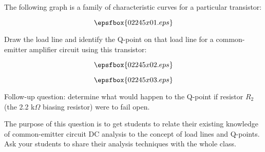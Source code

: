 

The following graph is a family of characteristic curves for a particular transistor:

$$\epsfbox{02245x01.eps}$$

Draw the load line and identify the Q-point on that load line for a common-emitter amplifier circuit using this transistor:

$$\epsfbox{02245x02.eps}$$







$$\epsfbox{02245x03.eps}$$

\vskip 10pt

Follow-up question: determine what would happen to the Q-point if resistor $R_2$ (the 2.2 k$\Omega$ biasing resistor) were to fail open.







The purpose of this question is to get students to relate their existing knowledge of common-emitter circuit DC analysis to the concept of load lines and Q-points.  Ask your students to share their analysis techniques with the whole class.





